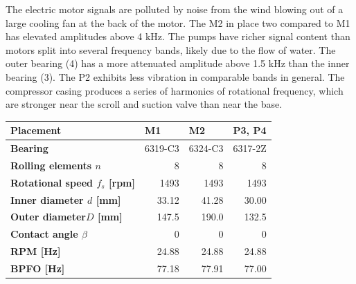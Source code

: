The electric motor signals are polluted by noise from the wind blowing out of a large cooling fan at the back of the motor. The M2 in place two compared to M1 has elevated amplitudes above 4 kHz. The pumps have richer signal content than motors split into several frequency bands, likely due to the flow of water. The outer bearing (4) has a more attenuated amplitude above 1.5 kHz than the inner bearing (3). The P2 exhibits less vibration in comparable bands in general. The compressor casing produces a series of harmonics of rotational frequency, which are stronger near the scroll and suction valve than near the base.

\begin{table}[h]
\centering
\begin{tabular}{|l|r|r|r|}
\hline
\textbf{Placement}     & \multicolumn{1}{l|}{\textbf{M1}} & \multicolumn{1}{l|}{\textbf{M2}} & \multicolumn{1}{l|}{\textbf{P3, P4}} \\ \hline
\textbf{Bearing}       & \multicolumn{1}{l|}{6319-C3}            & \multicolumn{1}{l|}{6324-C3}            & \multicolumn{1}{l|}{6317-2Z}                  \\ \hline
\textbf{Rolling elements $n$}           & 8                                       & 8                                       & 8                                             \\ \hline
\textbf{Rotational speed $f_s$ {[}rpm{]}}         & 1493                                    & 1493                                    & 1493                                          \\ \hline
\textbf{Inner diameter $d$ {[}mm{]}}  & 33.12                                   & 41.28                                   & 30.00                                         \\ \hline
\textbf{Outer diameter$D$ {[}mm{]}}  & 147.5                                   & 190.0                                   & 132.5                                         \\ \hline
\textbf{Contact angle $\beta$}       & 0                                       & 0                                       & 0                                             \\ \hline
\textbf{RPM {[}Hz{]}}  & 24.88                                   & 24.88                                   & 24.88                                         \\ \hline
\textbf{BPFO {[}Hz{]}} & 77.18                                   & 77.91                                   & 77.00                                         \\ \hline

\end{tabular}
\end{table}
